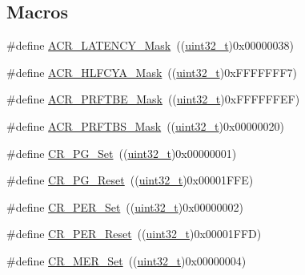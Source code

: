 \subsection*{Macros}
\begin{DoxyCompactItemize}
\item 
\#define \hyperlink{group___f_l_a_s_h___private___defines_ga5f1112c5731f01b063fdf2461efbedf7}{A\+C\+R\+\_\+\+L\+A\+T\+E\+N\+C\+Y\+\_\+\+Mask}~((\hyperlink{_p_e___types_8h_a33594304e786b158f3fb30289278f5af}{uint32\+\_\+t})0x00000038)
\item 
\#define \hyperlink{group___f_l_a_s_h___private___defines_ga6b6f73163f3a90f5072b6b7dc9fb63b7}{A\+C\+R\+\_\+\+H\+L\+F\+C\+Y\+A\+\_\+\+Mask}~((\hyperlink{_p_e___types_8h_a33594304e786b158f3fb30289278f5af}{uint32\+\_\+t})0x\+F\+F\+F\+F\+F\+F\+F7)
\item 
\#define \hyperlink{group___f_l_a_s_h___private___defines_gaf95fa450690ce94c4f4357e4dd72791a}{A\+C\+R\+\_\+\+P\+R\+F\+T\+B\+E\+\_\+\+Mask}~((\hyperlink{_p_e___types_8h_a33594304e786b158f3fb30289278f5af}{uint32\+\_\+t})0x\+F\+F\+F\+F\+F\+F\+E\+F)
\item 
\#define \hyperlink{group___f_l_a_s_h___private___defines_ga257768fe5d61ac49f43b6b90ba413102}{A\+C\+R\+\_\+\+P\+R\+F\+T\+B\+S\+\_\+\+Mask}~((\hyperlink{_p_e___types_8h_a33594304e786b158f3fb30289278f5af}{uint32\+\_\+t})0x00000020)
\item 
\#define \hyperlink{group___f_l_a_s_h___private___defines_gaf4fdb45c4a4d30dcddc389ec920f720f}{C\+R\+\_\+\+P\+G\+\_\+\+Set}~((\hyperlink{_p_e___types_8h_a33594304e786b158f3fb30289278f5af}{uint32\+\_\+t})0x00000001)
\item 
\#define \hyperlink{group___f_l_a_s_h___private___defines_gadda1a996e1867e911aaa7b0f30eb6834}{C\+R\+\_\+\+P\+G\+\_\+\+Reset}~((\hyperlink{_p_e___types_8h_a33594304e786b158f3fb30289278f5af}{uint32\+\_\+t})0x00001\+F\+F\+E)
\item 
\#define \hyperlink{group___f_l_a_s_h___private___defines_ga6e5e45c62f559102546b40de50c700bd}{C\+R\+\_\+\+P\+E\+R\+\_\+\+Set}~((\hyperlink{_p_e___types_8h_a33594304e786b158f3fb30289278f5af}{uint32\+\_\+t})0x00000002)
\item 
\#define \hyperlink{group___f_l_a_s_h___private___defines_gad564767c401a1a9c36b71342448fd256}{C\+R\+\_\+\+P\+E\+R\+\_\+\+Reset}~((\hyperlink{_p_e___types_8h_a33594304e786b158f3fb30289278f5af}{uint32\+\_\+t})0x00001\+F\+F\+D)
\item 
\#define \hyperlink{group___f_l_a_s_h___private___defines_ga7e5cf18b31b5ed960cd05a816cadf973}{C\+R\+\_\+\+M\+E\+R\+\_\+\+Set}~((\hyperlink{_p_e___types_8h_a33594304e786b158f3fb30289278f5af}{uint32\+\_\+t})0x00000004)

\end{DoxyCompactItemize}
